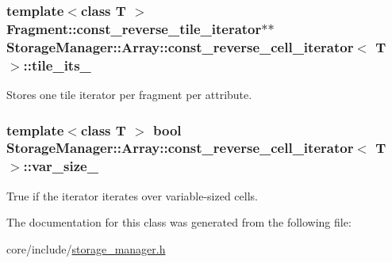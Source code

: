 \subsubsection[{tile\+\_\+its\+\_\+}]{\setlength{\rightskip}{0pt plus 5cm}template$<$class T $>$ {\bf Fragment\+::const\+\_\+reverse\+\_\+tile\+\_\+iterator}$\ast$$\ast$ {\bf Storage\+Manager\+::\+Array\+::const\+\_\+reverse\+\_\+cell\+\_\+iterator}$<$ T $>$\+::tile\+\_\+its\+\_\+\hspace{0.3cm}{\ttfamily [private]}}\label{classStorageManager_1_1Array_1_1const__reverse__cell__iterator_ad3ec6eabf371f96e8b91d101f8e17675}
Stores one tile iterator per fragment per attribute. \hypertarget{classStorageManager_1_1Array_1_1const__reverse__cell__iterator_a605db1ee1adf195b8c846e65a730c025}{}
\subsubsection[{var\+\_\+size\+\_\+}]{\setlength{\rightskip}{0pt plus 5cm}template$<$class T $>$ bool {\bf Storage\+Manager\+::\+Array\+::const\+\_\+reverse\+\_\+cell\+\_\+iterator}$<$ T $>$\+::var\+\_\+size\+\_\+\hspace{0.3cm}{\ttfamily [private]}}\label{classStorageManager_1_1Array_1_1const__reverse__cell__iterator_a605db1ee1adf195b8c846e65a730c025}
True if the iterator iterates over variable-\/sized cells. 

The documentation for this class was generated from the following file\+:\begin{DoxyCompactItemize}
\item 
core/include/\hyperlink{storage__manager_8h}{storage\+\_\+manager.\+h}\end{DoxyCompactItemize}
